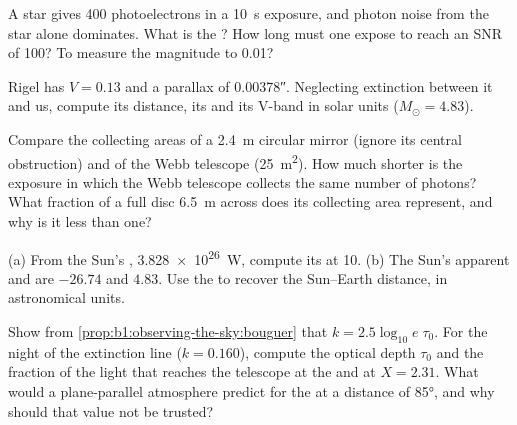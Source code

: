 \begin{exercise}[$\star\star$]\label{exo:b1:observing-the-sky:6}
A star gives 400 photoelectrons in a \qty{10}{s} exposure, and photon noise
from the star alone dominates. What is the ? How long
must one expose to reach an SNR of 100? To measure the magnitude to
\num{0.01}?
\end{exercise}

\begin{exercise}[$\star\star$]\label{exo:b1:observing-the-sky:7}
Rigel has $V = 0.13$ and a parallax of \ang{;;0.00378}. Neglecting
extinction between it and us, compute its distance, its 
and its V-band  in solar units ($M_\odot = 4.83$).
\end{exercise}

\begin{exercise}[$\star\star$]\label{exo:b1:observing-the-sky:8}
Compare the collecting areas of a \qty{2.4}{m} circular mirror (ignore its
central obstruction) and of the Webb telescope (\qty{25}{m^2}). How much
shorter is the exposure in which the Webb telescope collects the same number
of photons? What fraction of a full disc \qty{6.5}{m} across does its
collecting area represent, and why is it less than one?
\end{exercise}

\begin{exercise}[$\star\star$]\label{exo:b1:observing-the-sky:9}
(a) From the Sun's , \qty{3.828e26}{W}, compute its  at
\qty{10}{\parsec}. (b) The Sun's apparent and  are
$-26.74$ and $4.83$. Use the  to recover the Sun--Earth
distance, in astronomical units.
\end{exercise}

\begin{exercise}[$\star\star\star$]\label{exo:b1:observing-the-sky:10}
Show from \cref{prop:b1:observing-the-sky:bouguer} that $k =
2.5\log_{10}e\;\tau_0$. For the night of the extinction line ($k =
\num{0.160}$), compute the  optical depth $\tau_0$ and the fraction of
the light that reaches the telescope at the  and at $X = 2.31$. What
would a plane-parallel atmosphere predict for the  at a 
distance of \ang{85}, and why should that value not be trusted?
\end{exercise}

